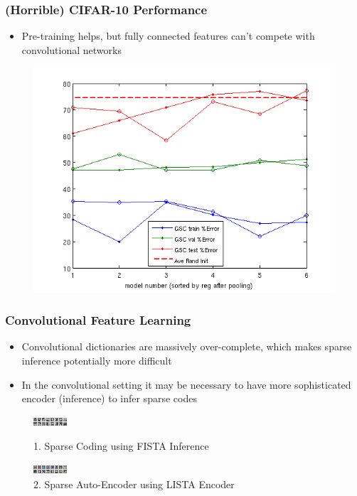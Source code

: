 \documentclass{beamer}
\begin{document}
\begin{frame}
\frametitle{(Horrible) CIFAR-10 Performance}
\begin{itemize} 
\item Pre-training helps, but fully connected features can't compete with convolutional networks 
\end{itemize} 
\begin{centering} 
\begin{figure} 
\includegraphics[scale=0.4]{./figures/class_graph.png} \hspace{0.5cm} 
\end{figure} 
\end{centering} 
\end{frame} 

\begin{frame}
\frametitle{Convolutional Feature Learning}  
\begin{itemize}
\item Convolutional dictionaries are massively over-complete, which makes sparse inference potentially more difficult
\item In the convolutional setting it may be necessary to have more sophisticated encoder (inference) to infer sparse codes 
\end{itemize} 
\begin{figure} 
\includegraphics[scale=2]{./figures/dec_SC.png}
\caption{1. Sparse Coding using FISTA Inference}
\includegraphics[scale=2]{./figures/LISTA1_dec.png}
\caption{2. Sparse Auto-Encoder using LISTA Encoder}
\end{figure} 
\end{frame} 
\end{document}
